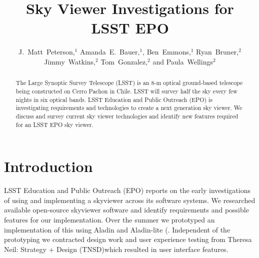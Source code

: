 \documentclass[11pt,twoside]{article}
\begin{document}
\title{Sky Viewer Investigations for LSST EPO}

\author{J.~Matt~Peterson,$^1$ Amanda~E.~Bauer,$^1$, Ben~Emmons,$^1$ Ryan~Bruner,$^2$ Jimmy~Watkins,$^2$ Tom~Gonzalez,$^2$ and Paula~Wellings$^2$}


\begin{abstract}
The Large Synoptic Survey Telescope (LSST) is an 8-m optical ground-based telescope being constructed on Cerro Pachon in Chile. LSST will survey half the sky every few nights in six optical bands. LSST Education and Public Outreach (EPO) is investigating requirements and technologies to create a next generation sky viewer. We discuss and survey current sky viewer technologies and identify new features required for an LSST EPO sky viewer.
\end{abstract}

\section{Introduction}
LSST Education and Public Outreach (EPO) reports on the early investigations of using and implementing a skyviewer across its software systems. We researched available open-source skyviewer software and identify requirements and possible features for our implementation. Over the summer we prototyped an implementation of this using Aladin and Aladin-lite (\citet{2014ASPC..485..277B}. Independent of the prototyping we contracted design work and user experience testing from Theresa Neil: Strategy + Design (TNSD)\footnotemark[1] which resulted in user interface features.
\end{document}
